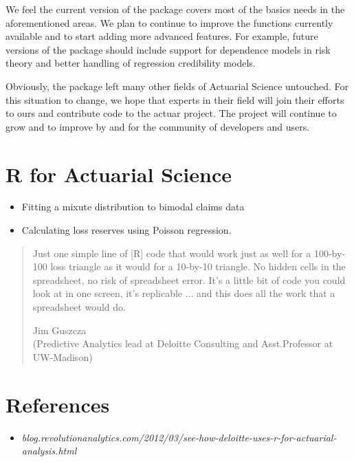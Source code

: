 \documentclass[12pt]{article}
\begin{document}
We feel the current version of the package covers most of the basics needs in the aforementioned areas. We plan to continue to improve the functions currently available and to start adding more advanced features. For example, future versions of the package should include support for dependence models in risk theory and better handling of regression credibility models.

Obviously, the package left many other fields of Actuarial Science untouched. For this situation to change, we hope that experts in their field will join their efforts to ours and contribute code to the actuar project. The project will continue to grow and to improve by and for the community of developers and users.


\newpage
\section{R for Actuarial Science}
\begin{itemize}
\item Fitting a mixute distribution to bimodal claims data
\item Calculating loss reserves using Poisson regression.
\end{itemize}
\begin{quotation}
Just one simple line of [R] code that would work just as well for a 100-by-100 loss triangle as it would for a 10-by-10 triangle. No hidden cells in the spreadsheet, no risk of spreadsheet error. It's a little bit of code you could look at in one screen, it's replicable ... and this does all the work that a spreadsheet would do.

Jim Guszcza \\(Predictive Analytics lead at Deloitte Consulting and Asst.Professor at UW-Madison)
\end{quotation}

\section{References}
\begin{itemize}
\item \textit{\small{blog.revolutionanalytics.com/2012/03/see-how-deloitte-uses-r-for-actuarial-analysis.html}}
\end{itemize}
\end{document}
